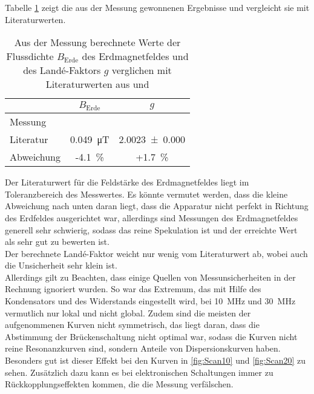 Tabelle \ref{tab:Ergebnisse} zeigt die aus der Messung gewonnenen Ergebnisse und vergleicht sie mit Literaturwerten.

\begin{table}[h!]
	\centering
	\caption{Aus der Messung berechnete Werte der Flussdichte $B_\text{Erde}$ des Erdmagnetfeldes und des Landé-Faktors $g$ verglichen mit Literaturwerten aus \cite{BErde} und \cite{gFaktor}}
	\label{tab:Ergebnisse}
	\begin{tabular}{l|cc}
		& $B_\text{Erde}$ & $g$ \\
		\hline
		Messung &  &  \\
		Literatur & \SI{0.049}{\micro\tesla} & \SI{2.0023(0)}{} \\
		\hline
		Abweichung & -\SI{4.1}{\%} & +\SI{1.7}{\%}
	\end{tabular}
\end{table}

Der Literaturwert für die Feldstärke des Erdmagnetfeldes liegt im Toleranzbereich des Messwertes. Es könnte vermutet werden, dass die kleine Abweichung nach unten daran liegt, dass die Apparatur nicht perfekt in Richtung des Erdfeldes ausgerichtet war, allerdings sind Messungen des Erdmagnetfeldes generell sehr schwierig, sodass das reine Spekulation ist und der erreichte Wert als sehr gut zu bewerten ist. \\
Der berechnete Landé-Faktor weicht nur wenig vom Literaturwert ab, wobei auch die Unsicherheit sehr klein ist. \\
Allerdings gilt zu Beachten, dass einige Quellen von Messunsicherheiten in der Rechnung ignoriert wurden. So war das Extremum, das mit Hilfe des Kondensators und des Widerstands eingestellt wird, bei \SI{10}{\mega\hertz} und \SI{30}{\mega\hertz} vermutlich nur lokal und nicht global. Zudem sind die meisten der aufgenommenen Kurven nicht symmetrisch, das liegt daran, dass die Abstimmung der Brückenschaltung nicht optimal war, sodass die Kurven nicht reine Resonanzkurven sind, sondern Anteile von Dispersionskurven haben. Besonders gut ist dieser Effekt bei den Kurven in \ref{fig:Scan10} und \ref{fig:Scan20} zu sehen. Zusätzlich dazu kann es bei elektronischen Schaltungen immer zu Rückkopplungseffekten kommen, die die Messung verfälschen.
